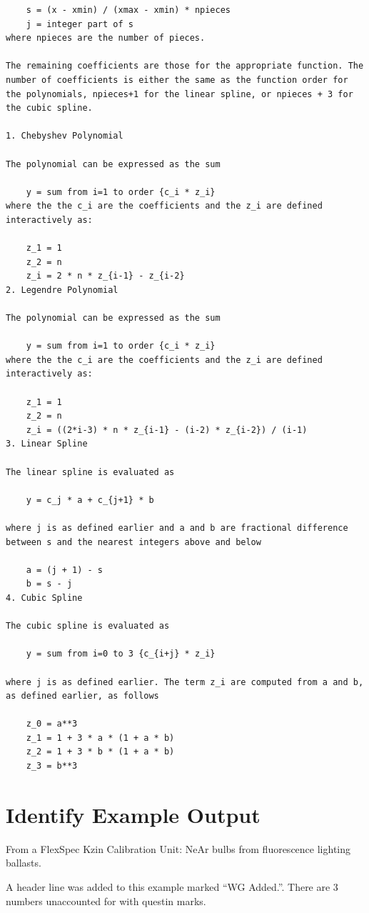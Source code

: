 \begin{verbatim}
	s = (x - xmin) / (xmax - xmin) * npieces
	j = integer part of s
where npieces are the number of pieces.

The remaining coefficients are those for the appropriate function. The
number of coefficients is either the same as the function order for
the polynomials, npieces+1 for the linear spline, or npieces + 3 for
the cubic spline.

1. Chebyshev Polynomial

The polynomial can be expressed as the sum

	y = sum from i=1 to order {c_i * z_i}
where the the c_i are the coefficients and the z_i are defined interactively as:

	z_1 = 1
	z_2 = n
	z_i = 2 * n * z_{i-1} - z_{i-2}
2. Legendre Polynomial

The polynomial can be expressed as the sum

	y = sum from i=1 to order {c_i * z_i}
where the the c_i are the coefficients and the z_i are defined interactively as:

	z_1 = 1
	z_2 = n
	z_i = ((2*i-3) * n * z_{i-1} - (i-2) * z_{i-2}) / (i-1)
3. Linear Spline

The linear spline is evaluated as

	y = c_j * a + c_{j+1} * b

where j is as defined earlier and a and b are fractional difference
between s and the nearest integers above and below

	a = (j + 1) - s
	b = s - j
4. Cubic Spline

The cubic spline is evaluated as

	y = sum from i=0 to 3 {c_{i+j} * z_i}

where j is as defined earlier. The term z_i are computed from a and b,
as defined earlier, as follows

	z_0 = a**3
	z_1 = 1 + 3 * a * (1 + a * b)
	z_2 = 1 + 3 * b * (1 + a * b)
	z_3 = b**3
\end{verbatim}
\endgroup


\section{Identify Example Output}

From a FlexSpec Kzin Calibration Unit: NeAr bulbs from fluorescence
lighting ballasts.

A header line was added to this example marked ``WG Added.''. There
are 3 numbers unaccounted for with questin marks.

